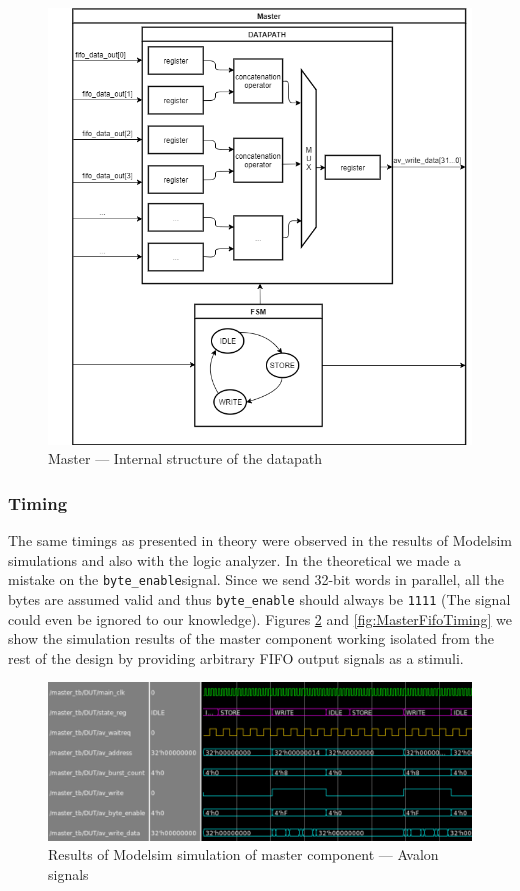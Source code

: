 \documentclass{article}
\begin{document}
\begin{figure}[H]
\centering
\includegraphics[scale=0.6]{images/MasterInside.png}
\caption{Master --- Internal structure of the datapath}
\label{fig:MasterInside}
\end{figure}

\subsubsection{Timing}

The same timings as presented in theory were observed in the results of Modelsim simulations and also with the logic analyzer. In the theoretical we made a mistake on the \verb'byte_enable'signal. Since we send 32-bit words in parallel, all the bytes are assumed valid and thus \verb'byte_enable' should always  be \verb'1111' (The signal could even be ignored to our knowledge). Figures \ref{fig:MasterAvalonTiming} and \ref{fig:MasterFifoTiming} we show the simulation results of the master component working isolated from the rest of the design by providing arbitrary FIFO output signals as a stimuli.
\begin{figure}[H]
\centering
\includegraphics[scale=0.65]{images/MasterAvalonTiming.png}
\caption{Results of Modelsim simulation of master component --- Avalon signals}
\label{fig:MasterAvalonTiming}
\end{figure}
\end{document}
